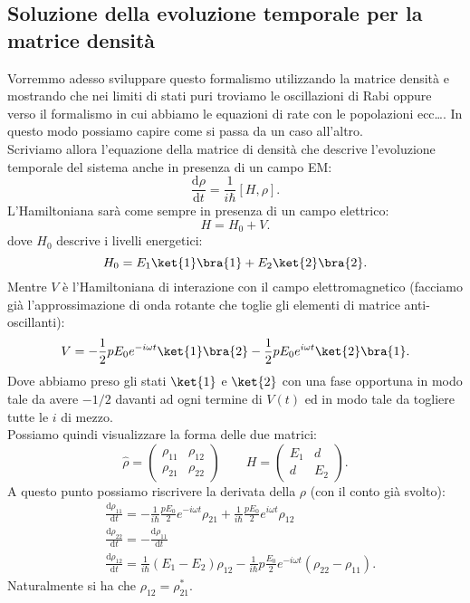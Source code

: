 \subsection{Soluzione della evoluzione temporale per la matrice densità}%
Vorremmo adesso sviluppare questo formalismo utilizzando la matrice densità e mostrando che nei limiti di stati puri troviamo le oscillazioni di Rabi oppure verso il formalismo in cui abbiamo le equazioni di rate con le popolazioni ecc\ldots. In questo modo possiamo capire come si passa da un caso all'altro.\\
Scriviamo allora l'equazione della matrice di densità che descrive l'evoluzione temporale del sistema anche in presenza di un campo EM:
\[
\frac{\text{d} \rho}{\text{d} t} = \frac{1}{i \hbar}\left[H,\rho\right]
.\] 
L'Hamiltoniana sarà come sempre in presenza di un campo elettrico:
\[
H= H_0+V
.\]
dove $H_0$ descrive i livelli energetici:
\[
H_0=E_1\ket{1}\bra{1}+E_2\ket{2}\bra{2}
.\] 
Mentre $V$ è l'Hamiltoniana di interazione con il campo elettromagnetico (facciamo già l'approssimazione di onda rotante che toglie gli elementi di matrice anti-oscillanti):
\[
V=-\frac{1}{2}pE_0e^{-i\omega t}\ket{1}\bra{2}-\frac{1}{2}pE_0e^{i\omega t}\ket{2}\bra{1}
.\] 
Dove abbiamo preso gli stati $\ket{1}$ e $\ket{2}$ con una fase opportuna in modo tale da avere $-1 /2$ davanti ad ogni termine di $V(t) $ ed in modo tale da togliere tutte le $i$ di mezzo.\\
Possiamo quindi visualizzare la forma delle due matrici:
\[
    \hat{\rho} = \begin{pmatrix} \rho_{11} & \rho_{12} \\ \rho_{21} & \rho_{22} \end{pmatrix} \qquad
    H = \begin{pmatrix} E_1 & d \\ d & E_2\end{pmatrix} 
.\] 
A questo punto possiamo riscrivere la derivata della $\rho$ (con il conto già svolto):
\[\begin{aligned}
    &\frac{\text{d} \rho_{11}}{\text{d} t} =
	-\frac{1}{i\hbar }\frac{pE_0}{2}e^{-i\omega t}\rho_{21}
	+\frac{1}{i\hbar }\frac{pE_0}{2}e^{i\omega t}\rho_{12} \\
    &\frac{\text{d} \rho_{22}}{\text{d} t} = 
    -\frac{\text{d} \rho_{11}}{\text{d} t} \\
    &\frac{\text{d} \rho_{12}}{\text{d} t} =
    \frac{1}{i\hbar }\left(E_1-E_2\right)\rho_{12}
    -\frac{1}{i\hbar}p\frac{E_0}{2}e^{-i\omega t}
    \left(\rho_{22}-\rho_{11}\right)
.\end{aligned}\]
Naturalmente si ha che $\rho_{12}=\rho_{21}^*$.
